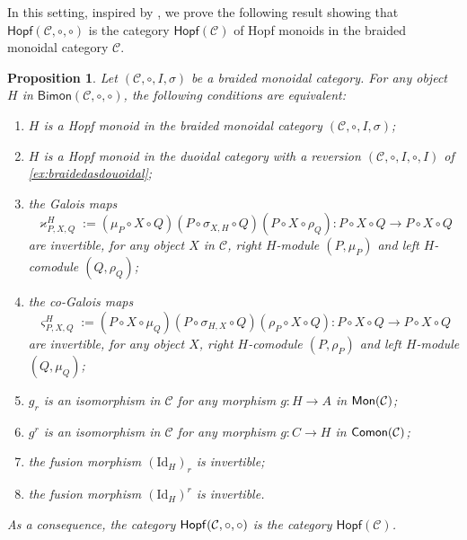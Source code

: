 \documentclass[nosumlimits,twoside]{amsart}
\newtheorem{proposition}[proposition]{\sc Proposition}
\theoremstyle{definition}
\theoremstyle{remark}
\newcommand{\rd}[1]{{\color{red}{#1}}}
\newcommand{\id}{\mathrm{Id}}
\newcommand{\Cc}{\mathcal{C}}
\def\Comon{{\sf Comon}}
\def\Mon{{\sf Mon}}
\def\Hopfmon{{\sf Hopf}}
\begin{document}
In this setting, inspired by \cite[Theorem 7.17]{Bohm-Lack}, we prove the following result showing that $\mathsf{Hopf}(\Cc,\circ,\circ)$ is the category $\mathsf{Hopf}(\Cc)$ of Hopf monoids in the braided monoidal category $\Cc$.

\begin{proposition}%
\label{pro:Hopfmonbraidedcat}
    Let $(\Cc,\circ,I,\sigma)$ be a braided monoidal category.
For any object $H$ in $\mathsf{Bimon}(\Cc,\circ,\circ)$, the following conditions are equivalent:
\begin{enumerate}
    \item $H$ is a Hopf monoid in the braided monoidal category $(\Cc,\circ,I,\sigma)$;
     \item $H$ is a Hopf monoid in the duoidal category with a reversion $(\Cc,\circ,I,\circ,I)$ of \cref{ex:braidedasdouoidal};
     \item the Galois maps
 \[
 \varkappa _{P,X,Q}^{H} :=(\mu _{P}\circ X\circ Q)(P\circ\sigma_{X,H}\circ Q)(P\circ X \circ \rho _{Q}):P\circ X\circ Q\to P\circ X\circ Q
 \]
    are invertible, for any object $X$ in $\Cc$, right $H$-module $\left( P,\mu _{P}\right) $ and left $H$-comodule $\left( Q,\rho _{Q}\right)$;
      \item the co-Galois maps
\[
\varsigma _{P,X,Q}^{H}:=( P\circ X\circ \mu _{Q})(P\circ\sigma_{H,X}\circ Q)(\rho
_{P}\circ X\circ Q ):P\circ X\circ Q\to P\circ X\circ Q
\]
    are invertible, for any object $X$, right $H$-comodule $\left( P,\rho _{P}\right) $ and left $H$-module $\left( Q,\mu _{Q}\right) $;
    \item $g_r$ is an isomorphism in $\Cc$ for any morphism $g:H\to A$ in $\Mon(\Cc)$;
    \item $g^r$ is an isomorphism in $\Cc$ for any morphism $g:C\to H$ in $\Comon(\Cc)$;
     \item the fusion morphism $(\id_H)_r$ is invertible;
    \item the fusion morphism $(\id_H)^r$ is  invertible.
\end{enumerate}
As a consequence, the category $\Hopfmon(\Cc,\circ,\circ)$ is the category $\mathsf{Hopf}(\Cc)$.
\end{proposition}
\end{document}
